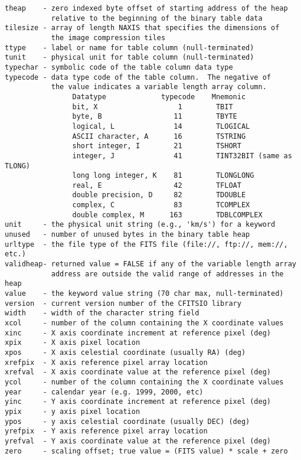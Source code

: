 \documentclass[11pt]{book}
\begin{document}
\begin{verbatim}
theap    - zero indexed byte offset of starting address of the heap
           relative to the beginning of the binary table data
tilesize - array of length NAXIS that specifies the dimensions of
           the image compression tiles
ttype    - label or name for table column (null-terminated)
tunit    - physical unit for table column (null-terminated)
typechar - symbolic code of the table column data type
typecode - data type code of the table column.  The negative of
           the value indicates a variable length array column.
                Datatype             typecode    Mnemonic
                bit, X                   1        TBIT
                byte, B                 11        TBYTE
                logical, L              14        TLOGICAL
                ASCII character, A      16        TSTRING
                short integer, I        21        TSHORT
                integer, J              41        TINT32BIT (same as TLONG)
                long long integer, K    81        TLONGLONG
                real, E                 42        TFLOAT
                double precision, D     82        TDOUBLE
                complex, C              83        TCOMPLEX
                double complex, M      163        TDBLCOMPLEX
unit     - the physical unit string (e.g., 'km/s') for a keyword
unused   - number of unused bytes in the binary table heap
urltype  - the file type of the FITS file (file://, ftp://, mem://, etc.)
validheap- returned value = FALSE if any of the variable length array
           address are outside the valid range of addresses in the heap
value    - the keyword value string (70 char max, null-terminated)
version  - current version number of the CFITSIO library
width    - width of the character string field
xcol     - number of the column containing the X coordinate values
xinc     - X axis coordinate increment at reference pixel (deg)
xpix     - X axis pixel location
xpos     - X axis celestial coordinate (usually RA) (deg)
xrefpix  - X axis reference pixel array location
xrefval  - X axis coordinate value at the reference pixel (deg)
ycol     - number of the column containing the X coordinate values
year     - calendar year (e.g. 1999, 2000, etc)
yinc     - Y axis coordinate increment at reference pixel (deg)
ypix     - y axis pixel location
ypos     - y axis celestial coordinate (usually DEC) (deg)
yrefpix  - Y axis reference pixel array location
yrefval  - Y axis coordinate value at the reference pixel (deg)
zero     - scaling offset; true value = (FITS value) * scale + zero
\end{verbatim}

\end{document}
